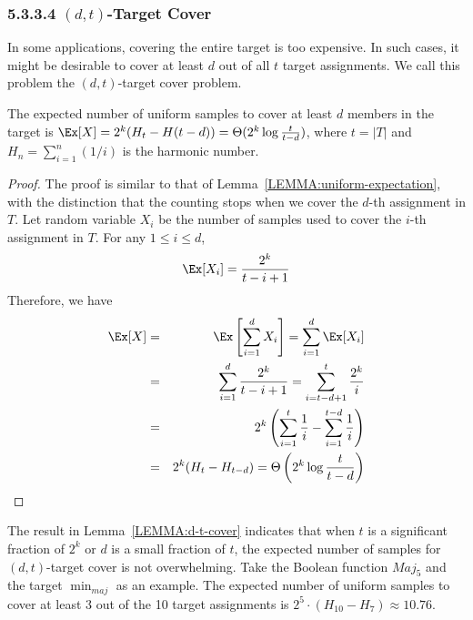\subsubsection{5.3.3.4 \enskip $(d,t)$-Target Cover}

In some applications, covering the entire target is too expensive. In
such cases, it might be desirable to cover at least $d$ out of all $t$
target assignments. We call this problem the $(d,t)$-target cover
problem.

\begin{lemma}
\label{LEMMA:d-t-cover}
The expected number of uniform samples to cover at least $d$ members in the target is $\Ex[X] = 2^k (H_{t}-H(t-d)) = \Theta(2^k \log{\frac{t}{t-d}})$, where $t = |T|$ and $H_{n} = \sum_{i=1}^n (1/i)$ is the harmonic number.
\end{lemma}

\begin{proof}
The proof is similar to that of Lemma~\ref{LEMMA:uniform-expectation},
with the distinction that the counting stops when we cover the $d$-th
assignment in $T$. Let random variable $X_i$ be the number of samples
used to cover the $i$-th assignment in $T$. For any $1\le i\le d$,
\[
  \Ex[X_i] = \frac{2^k}{t-i+1}
\]
Therefore, we have
\begin{eqnarray*}
  \Ex[X] &=& \Ex\left[\sum_{i=1}^d X_i\right] = \sum_{i=1}^d \Ex[X_i]\\
  &=& \sum_{i=1}^d \frac{2^k}{t-i+1} = \sum_{i=t-d+1}^t \frac{2^k}{i} \\
  &=& 2^k \left( \sum_{i=1}^t \frac{1}{i} - \sum_{i=1}^{t-d} \frac{1}{i} \right) \\
  &=& 2^k (H_t - H_{t-d}) = \Theta\left(2^k \log{\frac{t}{t-d}}\right)
\end{eqnarray*}
\end{proof}

The result in Lemma~\ref{LEMMA:d-t-cover} indicates that when $t$ is a
significant fraction of $2^k$ or $d$ is a small fraction of $t$, the
expected number of samples for $(d,t)$-target cover is not overwhelming.
Take the Boolean function $Maj_5$ and the target $\min_{maj}$ as an
example. The expected number of uniform samples to cover at least 3 out
of the 10 target assignments is $2^5 \cdot (H_{10} - H_{7}) \approx
10.76$.

